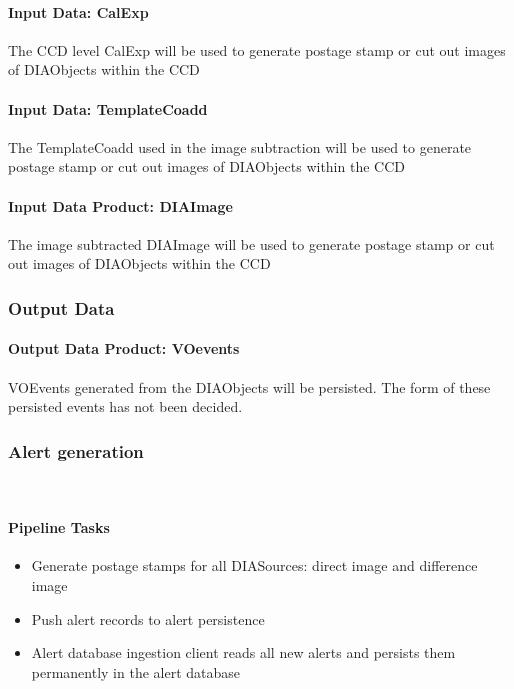 \paragraph{Input Data: CalExp}

The CCD level CalExp will be used to generate postage stamp or cut out images of DIAObjects  within the CCD

\paragraph{Input Data: TemplateCoadd}

The TemplateCoadd used in the image subtraction will be used to  generate postage stamp or cut out images of DIAObjects   within the CCD


\paragraph{Input Data Product: DIAImage}

The image subtracted DIAImage will be used to  generate postage stamp or cut out images of DIAObjects within the CCD

\subsubsection{Output Data}

\paragraph{Output Data Product: VOevents}

VOEvents generated from the DIAObjects will be persisted. The form of these persisted events has  not been decided.

\subsubsection{Alert generation}~

\paragraph{Pipeline Tasks}
 \begin{itemize}
\item Generate postage stamps for all DIASources: direct image and difference image
\item Push alert records to alert persistence
\item Alert database ingestion client reads all new alerts and persists them permanently in the alert database
\end{itemize}

